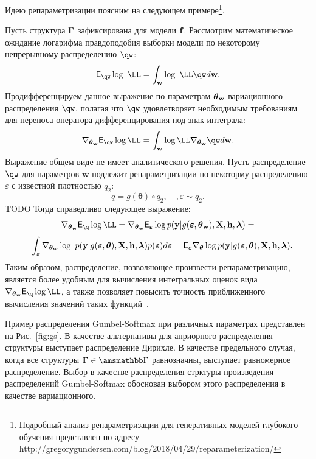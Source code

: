 Идею репараметризации поясним на следующем примере\footnote{Подробный анализ репараметризации для генеративных моделей глубокого обучения представлен по адресу http://gregorygundersen.com/blog/2018/04/29/reparameterization/}.
\begin{example} Пусть структура $\boldsymbol{\Gamma}$ зафиксирована для модели $\mathbf{f}$. Рассмотрим математическое ожидание логарифма правдоподобия выборки модели по некоторому непрерывному распределению $\qw$:
\[
    \E_{\qw} \log~\LL=  \int_{\w} \log~\LL \qw d\w.
\]
Продифференцируем данное выражение по параметрам $\boldsymbol{\theta}_\mathbf{w}$ вариационного распределения $\qw$, полагая что $\qw$ удовлетворяет необходимым требованиям для переноса оператора дифференцирования под знак интеграла:
\[
    \nabla_{\tetaw} \E_{\qw} \log \LL = 
\int_{\w}  \log \LL \nabla_{\tetaw}\qw d\w.
\]
Выражение общем виде не имеет аналитического решения. Пусть распределение $\qw$ для параметров $\mathbf{w}$ подлежит репараметризации по некоторму распределению $\varepsilon$ с известной плотностью $q_2$:
\[
    q = g(\boldsymbol{\theta}) \circ q_2, \quad, \varepsilon \sim q_2.
\] 
TODO
Тогда справедливо следующее выражение:
\[
 \nabla_{\tetaw} \E_{\q} \log \LL = \nabla_{\tetaw} \E_{\boldsymbol{\varepsilon}} \log p(\y|g(\boldsymbol{\varepsilon}, \tetaw), \X, \h, \lam) =
\]
\[= \int_{\boldsymbol{\varepsilon}}\nabla_{\boldsymbol{\theta}_\mathbf{w}} \log~p(\mathbf{y}|g(\boldsymbol{\varepsilon},\boldsymbol{\theta}), \mathbf{X}, \mathbf{h},\boldsymbol{\lambda}) p(\boldsymbol{\varepsilon}) d\boldsymbol{\varepsilon}=\mathsf{E}_{\boldsymbol{\varepsilon}} \nabla_{\boldsymbol{\theta}} \log p(\mathbf{y}|g(\boldsymbol{\varepsilon}, \boldsymbol{\theta}), \mathbf{X}, \mathbf{h}, \boldsymbol{\lambda}).\]
Таким образом, распределение, позволяющее произвести репараметризацию, является более удобным для вычисления интегральных оценок вида $ \nabla_{\tetaw} \E_{\q} \log \LL$, а также позволяет повысить точность приближенного вычисления значений таких функций~\cite{reparametrization}.
\end{example}

Пример распределения Gumbel-Softmax при различных параметрах представлен на Рис.~\ref{fig:gs}. В качестве альтернативы для априорного распределения структуры выступает  распределение Дирихле. В качестве предельного случая, когда все структуры $\G \in \Gb$ равнозначны, выступает равномерное распределение. Выбор в качестве распределения стрктуры произведения распределений Gumbel-Softmax  обоснован выбором этого распределения в качестве вариационного. 

